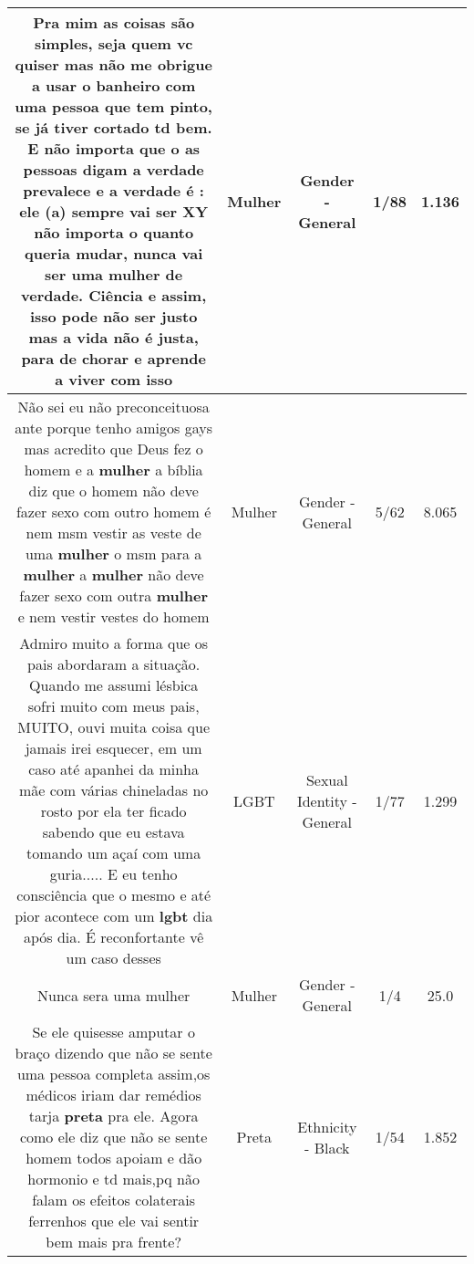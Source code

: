 \documentclass[11pt]{article}
\newlength\mylength
\begin{document}
\begin{center}
\begin{longtable}{|C{.65\mylength}|C{.30\mylength}|C{.12\mylength}|C{.12\mylength}|C{.12\mylength}|}
  \small Pra mim as coisas são simples, seja quem vc quiser mas não me obrigue a usar o banheiro com uma pessoa que tem pinto, se já tiver cortado td bem. E não importa que o as pessoas digam a verdade prevalece e a verdade é : ele (a) sempre vai ser XY não importa o quanto queria mudar, nunca vai ser uma \textbf{mulher} de verdade. Ciência e assim, isso pode não ser justo mas a vida não é justa, para de chorar e aprende a viver com isso\normalsize   & Mulher & Gender - General & 1/88 & 1.136 \\  \hline
  \small Não sei eu não preconceituosa ante porque tenho amigos gays mas acredito que Deus fez o homem e a \textbf{mulher} a bíblia diz que o homem não deve fazer sexo com outro homem é nem msm vestir as veste de uma \textbf{mulher} o msm para a \textbf{mulher} a \textbf{mulher} não deve fazer sexo com outra \textbf{mulher} e nem vestir vestes do homem\normalsize   & Mulher & Gender - General & 5/62 & 8.065 \\  \hline
  \small Admiro muito a forma que os pais abordaram a situação. Quando me assumi lésbica sofri muito com meus pais, MUITO, ouvi muita coisa que jamais irei esquecer, em um caso até apanhei da minha mãe com várias chineladas no rosto por ela ter ficado sabendo que eu estava tomando um açaí com uma guria..... E eu tenho consciência que o mesmo e até pior acontece com um \textbf{lgbt} dia após dia. É reconfortante vê um caso desses\normalsize   & LGBT & Sexual Identity - General & 1/77 & 1.299 \\  \hline
  \small Nunca sera uma mulher\normalsize   & Mulher & Gender - General & 1/4 & 25.0 \\  \hline
  \small Se ele quisesse amputar o braço dizendo que não se sente uma pessoa completa assim,os médicos iriam dar remédios tarja \textbf{preta} pra ele. Agora como ele diz que não se sente homem todos apoiam e dão hormonio e td mais,pq não falam os efeitos colaterais ferrenhos que ele vai sentir bem mais pra frente?\normalsize   & Preta & Ethnicity - Black & 1/54 & 1.852 \\  \hline

\end{longtable}
\end{center}
\end{document}
